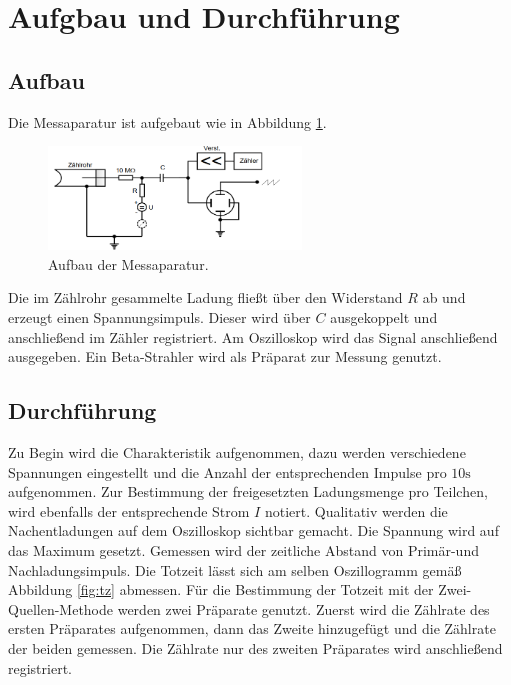 \section{Aufgbau und Durchführung}
\label{sec:Durchführung}
\subsection{Aufbau}
Die Messaparatur ist aufgebaut wie in Abbildung \ref{fig:aufbau}.
\begin{figure}
  \centering
  \includegraphics[width=0.6\textwidth]{aufbau.PNG}
  \caption{Aufbau der Messaparatur.}
  \label{fig:aufbau}
\end{figure}
Die im Zählrohr gesammelte Ladung fließt über den Widerstand $R$ ab und erzeugt einen Spannungsimpuls. Dieser wird über $C$ ausgekoppelt und
anschließend im Zähler registriert. Am Oszilloskop wird das Signal anschließend ausgegeben. Ein Beta-Strahler wird als Präparat
zur Messung genutzt.
\subsection{Durchführung}
Zu Begin wird die Charakteristik aufgenommen, dazu werden verschiedene Spannungen eingestellt und die Anzahl der entsprechenden
Impulse pro $10\si{\second}$ aufgenommen. Zur Bestimmung der freigesetzten Ladungsmenge pro Teilchen, wird ebenfalls der entsprechende
Strom $I$ notiert.
Qualitativ werden die Nachentladungen auf dem Oszilloskop sichtbar gemacht. Die Spannung wird auf das Maximum gesetzt. Gemessen
wird der zeitliche Abstand von Primär-und Nachladungsimpuls. Die Totzeit lässt sich am selben
Oszillogramm gemäß Abbildung \ref{fig:tz} abmessen.
Für die Bestimmung der Totzeit mit der Zwei-Quellen-Methode werden zwei Präparate genutzt. Zuerst wird die Zählrate
des ersten Präparates aufgenommen, dann das Zweite hinzugefügt und die Zählrate der beiden gemessen. Die Zählrate nur des zweiten Präparates
wird anschließend registriert.
